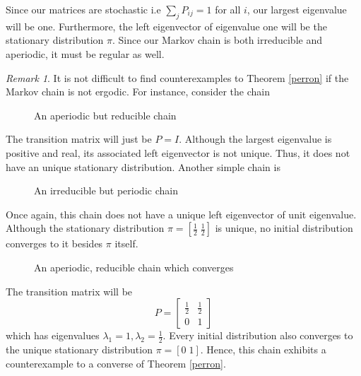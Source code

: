 \documentclass[12pt]{amsart}
\theoremstyle{definition}
\theoremstyle{remark}
\newtheorem{remark}[theorem]{Remark}
\numberwithin{equation}{section}
\theoremstyle{remark}
\begin{document}
\noindent Since our matrices are stochastic i.e $\sum_{j} P_{ij} = 1$ for all $i$, our largest eigenvalue will be one. Furthermore, the left eigenvector of eigenvalue one will be the stationary distribution $\pi$. Since our Markov chain is both irreducible and aperiodic, it must be regular as well.
%
\begin{remark}
  It is not difficult to find counterexamples to Theorem \ref{perron} if the Markov chain is not ergodic. For instance, consider the chain

  \begin{figure}[h!]
    \centering
    \caption{An aperiodic but reducible chain}
  \end{figure}
  The transition matrix will just be $P = I$. Although the largest eigenvalue is positive and real, its associated left eigenvector is not unique. Thus, it does not have an unique stationary distribution. Another simple chain is

  \begin{figure}[h!]
    \centering
    \caption{An irreducible but periodic chain}
  \end{figure}

  Once again, this chain does not have a unique left eigenvector of unit eigenvalue. Although the stationary distribution $\pi = [\frac{1}{2} \; \frac{1}{2}]$ is unique, no initial distribution converges to it besides $\pi$ itself.

  \begin{figure}[h!]
    \centering
    \caption{An aperiodic, reducible chain which converges}
  \end{figure}
  The transition matrix will be $$ P = \left[ \begin{matrix} \frac{1}{2} & \frac{1}{2} \\
  0 & 1 \end{matrix} \right]$$ which has eigenvalues $\lambda_1 = 1, \lambda_2 = \frac{1}{2}$. Every initial distribution also converges to the unique stationary distribution $\pi = [0 \; 1]$. Hence, this chain exhibits a counterexample to a converse of Theorem \ref{perron}.
\end{remark}
\end{document}
